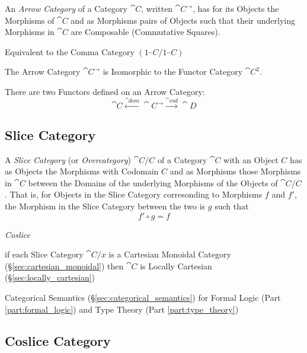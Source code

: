 An \emph{Arrow Category} of a Category $\cat{C}$, written
$\cat{C^{\rightarrow}}$, has for its Objects the Morphisms of
$\cat{C}$ and as Morphisms pairs of Objects such that their
underlying Morphisms in $\cat{C}$ are Composable (Commutative
Squares).

Equivalent to the Comma Category $(1_\cat{C}/1_\cat{C})$

The Arrow Category $\cat{C}^\rightarrow$ is Isomorphic to the
Functor Category $\cat{C^2}$.

There are two Functors defined on an Arrow Category:
\[
  \cat{C} \xleftarrow{\cat{dom}} \cat{C}^\rightarrow
  \xrightarrow{\cat{cod}} \cat{D}
\]



\subsection{Slice Category}\label{sec:slice_category}

A \emph{Slice Category} (or \emph{Overcategory}) $\cat{C}/C$ of a
Category $\cat{C}$ with an Object $C$ has as Objects the Morphisms
with Codomain $C$ and as Morphisms those Morphisms in $\cat{C}$
between the Domains of the underlying Morphisms of the Objects of
$\cat{C}/C$. That is, for Objects in the Slice Category corresonding
to Morphisms $f$ and $f'$, the Morphism in the Slice Category between
the two is $g$ such that
\[
  f' \circ g = f
\]

\emph{Coslice}

if each Slice Category $\cat{C}/x$ is a Cartesian Monoidal Category
(\S\ref{sec:cartesian_monoidal}) then $\cat{C}$ is Locally Cartesian
(\S\ref{sec:locally_cartesian})

Categorical Semantics (\S\ref{sec:categorical_semantics}) for Formal
Logic (Part \ref{part:formal_logic}) and Type Theory (Part
\ref{part:type_theory})



\subsection{Coslice Category}\label{sec:coslice_category}



